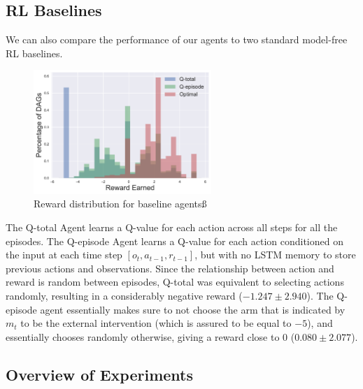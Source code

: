 \subsection{RL Baselines}

We can also compare the performance of our  agents to two standard model-free RL baselines. 

 \begin{figure}[h]
 \centering
 \includegraphics[width=0.6\textwidth]{figures/reward_dist.pdf} 
 \caption{Reward distribution for baseline agentsß}
 \label{fig:rewarddist}
 \end{figure}
 
The Q-total Agent learns a Q-value for each action across all steps for all the episodes. The Q-episode Agent learns a Q-value for each action conditioned on the input at each time step $[o_t, a_{t-1}, r_{t-1}]$, but with no LSTM memory to store previous actions and observations. Since the relationship between action and reward is random between episodes, Q-total was equivalent to selecting actions randomly, resulting in a considerably negative reward ($-1.247 \pm
2.940$). The Q-episode agent essentially makes sure to not choose the arm that is indicated by $m_t$ to be the external intervention (which is assured to be equal to $-5$), and essentially chooses randomly otherwise, giving a reward close to 0 ($0.080 \pm 2.077$).



\subsection{Overview of Experiments}

